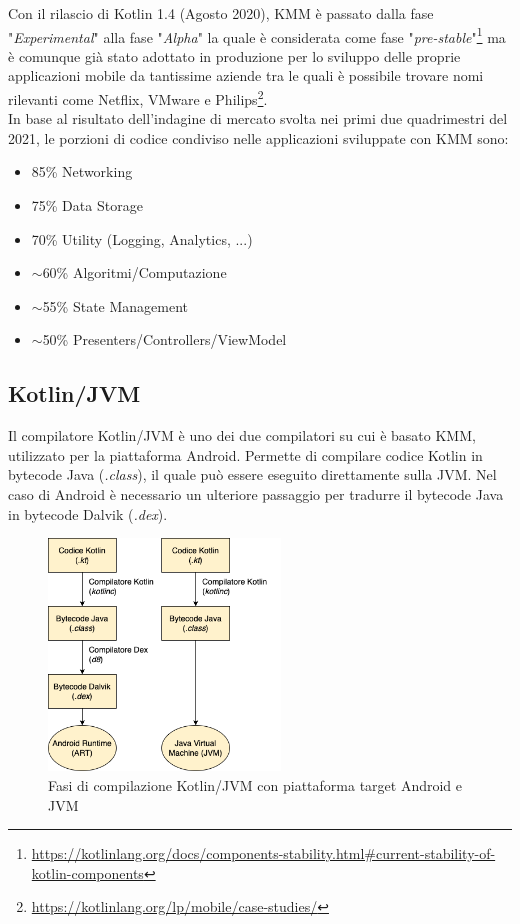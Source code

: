 Con il rilascio di Kotlin 1.4 (Agosto 2020), KMM è passato dalla fase "\textit{Experimental}" alla fase "\textit{Alpha}" la quale è considerata come fase "\textit{pre-stable}"\footnote{\url{https://kotlinlang.org/docs/components-stability.html\#current-stability-of-kotlin-components}} ma è comunque già stato adottato in produzione per lo sviluppo delle proprie applicazioni mobile da tantissime aziende tra le quali è possibile trovare nomi rilevanti come Netflix, VMware e Philips\footnote{\url{https://kotlinlang.org/lp/mobile/case-studies/}}.\\
In base al risultato dell'indagine di mercato svolta nei primi due quadrimestri del 2021\cite{kmm2}, le porzioni di codice condiviso nelle applicazioni sviluppate con KMM sono:
\begin{itemize}
    \item 85\% Networking
    \item 75\% Data Storage
    \item 70\% Utility (Logging, Analytics, ...)
    \item $\sim$60\% Algoritmi/Computazione
    \item $\sim$55\% State Management
    \item $\sim$50\% Presenters/Controllers/ViewModel
\end{itemize}

\subsection{Kotlin/JVM}
Il compilatore Kotlin/JVM è uno dei due compilatori su cui è basato KMM, utilizzato per la piattaforma Android. Permette di compilare codice Kotlin in bytecode Java (\textit{.class}), il quale può essere eseguito direttamente sulla JVM. Nel caso di Android è necessario un ulteriore passaggio per tradurre il bytecode Java in bytecode Dalvik (\textit{.dex}).

\begin{figure}[H]
\centering
\includegraphics[width=0.55\textwidth]{img/tesi-9-kotlinjvm.drawio.png}
\caption{Fasi di compilazione Kotlin/JVM con piattaforma target Android e JVM}
\end{figure}

